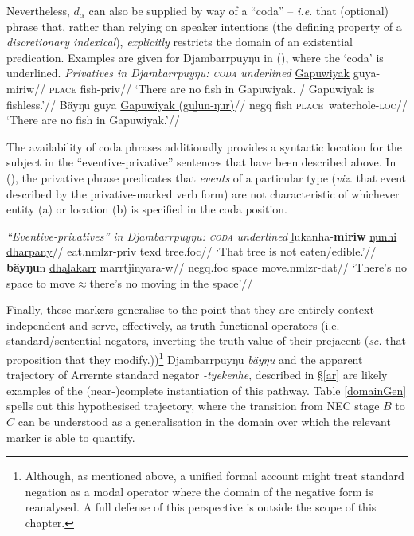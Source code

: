 \documentclass[usenames,dvipsnames,11pt]{article}
\begin{document}
{Nevertheless, $d_\alpha$ can also be supplied by way of a ``coda'' -- \textit{i.e.} that (optional) phrase that, rather than relying on speaker intentions (the defining property of a \textit{discretionary indexical}), \textit{explicitly} restricts the domain of an existential predication. Examples are given for Djambarrpuyŋu in (\nextx), where the `coda' is underlined.
\pex\textit{Privatives in Djambarrpuyŋu: \textsc{coda} underlined}
\a\begingl\gla \ul{Gapuwiyak} guya-miriw//
\glb \textsc{place} fish-\gls{priv}//
\glft`There are no fish in Gapuwiyak. / Gapuwiyak is fishless.'//\endgl
\a\begingl\gla Bäyŋu guya \ul{Gapuwiyak (guḻun-ŋur)}//
\glb  \gls{negq} fish \textsc{place}~waterhole-\textsc{loc}//
\glft`There are no fish in Gapuwiyak.'//\endgl\xe

\noindent The availability of coda phrases additionally provides a syntactic location for the subject in the ``eventive-privative'' sentences that have been described above. In (\nextx), the privative phrase predicates that \textit{events} of a particular type (\textit{viz.} that event described by the privative-marked verb form) are not characteristic of whichever entity (\nextx a) or location (\nextx b) is specified in the coda position.


\pex \textit{``Eventive-privatives'' in Djambarrpuyŋu: \textsc{coda} underlined}
\a \begingl\gla ḻukanha-\textbf{miriw} \ul{ŋunhi dharpany}//
\glb eat.\gls{nmlzr}-\gls{priv} \gls{texd} tree.\gls{foc}//
\glft`That tree is not eaten/edible.'//\endgl
\a\begingl\gla \textbf{bäyŋu}n \ul{dhaḻakarr} marrtjinyara-w//
\glb \gls{negq}.\gls{foc} space move.\gls{nmlzr}-\gls{dat}//
\glft  `There's no space to move$\approx$there's no moving in the space'//\endgl
\xe

Finally, these markers generalise to the point that they are entirely context-independent and serve, effectively, as truth-functional operators (i.e. standard/sentential negators, inverting the truth value of their prejacent (\textit{sc.} that proposition that they modify.))\footnote{Although, as mentioned above, a unified formal account might treat standard negation as a modal operator where the domain of the negative form is reanalysed. A full defense of this perspective is outside the scope of this chapter.} Djambarrpuyŋu \textit{bäyŋu} and the apparent trajectory of Arrernte standard negator \textit{-tyekenhe}, described in §\ref{ar} are likely examples of the (near-)complete instantiation of this pathway. Table \ref{domainGen} spells out this hypothesised trajectory, where the transition from NEC stage $ B $ to $ C $ can be understood as a generalisation in the domain over which the relevant marker is able to quantify.

}
\end{document}
